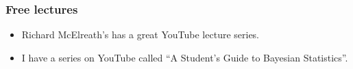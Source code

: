 \documentclass{beamer}
\begin{document}
\begin{frame}
	\frametitle{Free lectures}
	
	\begin{itemize}
		\item Richard McElreath's has a great YouTube lecture series.
		\item I have a series on YouTube called ``A Student's Guide to Bayesian Statistics''.
	\end{itemize}
	
\end{frame}
%
%
%	
%	
%	
\end{document}
